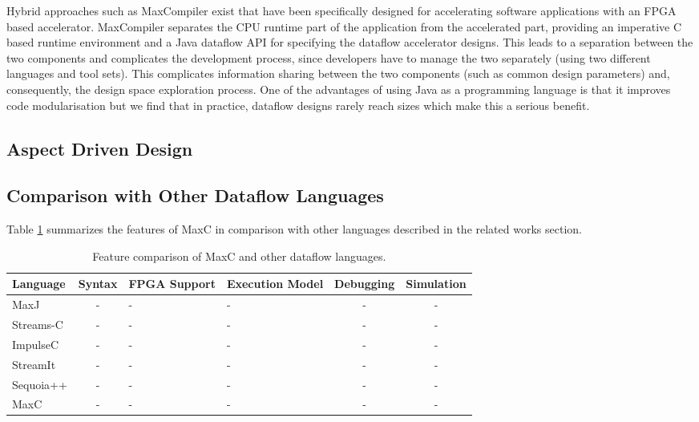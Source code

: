 Hybrid approaches such as MaxCompiler \cite{MaxelerTechnologies:2012}
exist that have been specifically designed for accelerating software
applications with an FPGA based accelerator. MaxCompiler separates the
CPU runtime part of the application from the accelerated part,
providing an imperative C based runtime environment and a Java
dataflow API for specifying the dataflow accelerator designs. This
leads to a separation between the two components and complicates the
development process, since developers have to manage the two
separately (using two different languages and tool sets). This
complicates information sharing between the two components (such as
common design parameters) and, consequently, the design space
exploration process. One of the advantages of using Java as a
programming language is that it improves code modularisation but we
find that in practice, dataflow designs rarely reach sizes which make
this a serious benefit.

\subsection{Aspect Driven Design}


\subsection{Comparison with Other Dataflow Languages}

Table \ref{table:feature-comparison} summarizes the features of MaxC
in comparison with other languages described in the related works
section.

\begin{table}[!h]
  \renewcommand{\arraystretch}{1.3}
  \centering
  \caption{Feature comparison of MaxC and other dataflow languages.}
  \label{table:feature-comparison}
  \begin{tabular}{ l | c |  p{1cm} |  p{1cm} |  c |  c }
    Language  & Syntax & FPGA Support & Execution Model & Debugging & Simulation \\ \hline
    MaxJ      & -      & -            & -               & -         & -          \\
    Streams-C & -      & -            & -               & -         & -          \\
    ImpulseC  & -      & -            & -               & -         & -          \\
    StreamIt  & -      & -            & -               & -         & -          \\
    Sequoia++ & -      & -            & -               & -         & -          \\
    MaxC      & -      & -            & -               & -         & -          \\
  \end{tabular}
\end{table}


